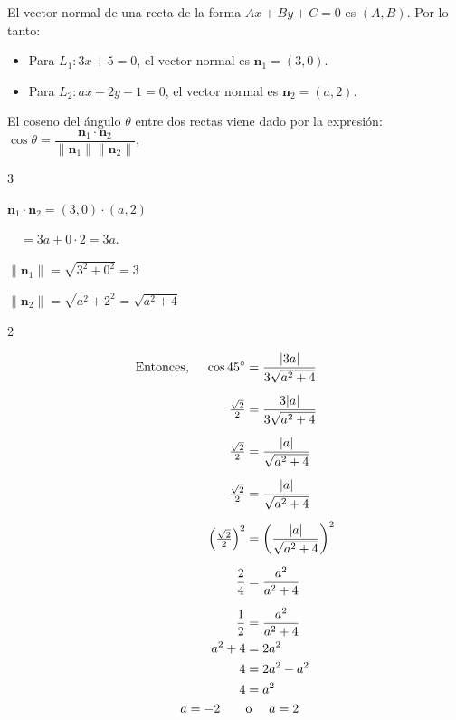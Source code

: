 \documentclass[11pt]{article}
\newcommand{\marka}[2]{
{\tikz[remember picture,overlay]\coordinate (#1) at #2;}
}
\begin{document}
\begin{enumerate}[\hspace{-5mm} 1) ]
El vector normal de una recta de la forma $Ax + By + C = 0$ es $(A, B)$. Por lo tanto:
\begin{itemize}
    \item Para $L_1: 3x + 5 = 0$, el vector normal es $\mathbf{n}_1 = (3, 0)$.
    \item Para $L_2: ax + 2y - 1 = 0$, el vector normal es $\mathbf{n}_2 = (a, 2)$.
\end{itemize}





El coseno del ángulo $\theta$ entre dos rectas viene dado por la expresión: \quad $
    \cos \theta = \dfrac{\mathbf{n}_1 \cdot \mathbf{n}_2}{\|\mathbf{n}_1\| \|\mathbf{n}_2\|},$

\medskip

\begin{itemize}
\begin{multicols}{3}
    \item  $    \mathbf{n}_1 \cdot \mathbf{n}_2 = (3,0) \cdot (a,2)$ 
     
    \, \qquad\  $ = 3a + 0 \cdot 2 = 3a.$
    \columnbreak

    \item $\|\mathbf{n}_1\| = \sqrt{3^2 + 0^2} = 3$
    
    \item $ \|\mathbf{n}_2\| = \sqrt{a^2 + 2^2} = \sqrt{a^2 + 4}$
\end{multicols}
\end{itemize}


\vspace{-6mm}
\begin{multicols}{2}



\begin{align*}
\text{Entonces, }\quad  \marka{a}{(-.1,.15)}  \cos 45^\circ 
    &=
    \frac{|3a|}{3\sqrt{a^2+4}} 
    \\[2mm]
    \marka{b}{(-.4,.35)} \tfrac{\sqrt{2}}{2} 
    &=
    \frac{3|a|}{3\sqrt{a^2+4}} 
    \\[2mm]
    \tfrac{\sqrt{2}}{2} 
    &=  \frac{|a|}{\sqrt{a^2+4}}
    \\[2mm]
    \tfrac{\sqrt{2}}{2} 
    &= 
    \frac{|a|}{\sqrt{a^2+4}} 
    \\[2mm]
    \left(\tfrac{\sqrt{2}}{2} \right)^2
    &= 
    \left(\frac{|a|}{\sqrt{a^2+4}} \right)^2
    \\[2mm]
     \frac{2}{4}
    &= 
    \frac{a^2}{a^2 + 4}
    \\[2mm]
    \frac{1}{2}
    &= 
    \frac{a^2}{a^2 + 4} 
    \\
    a^2 + 4 
    &= 
    2a^2
    \\
    4
    &=
     2a^2 - a^2
    \\
     4
    &= a^2 \\
    a=-2 \qquad &\text{o } \quad a= 2 
\end{align*}



\end{multicols}
\end{enumerate}
\end{document}
